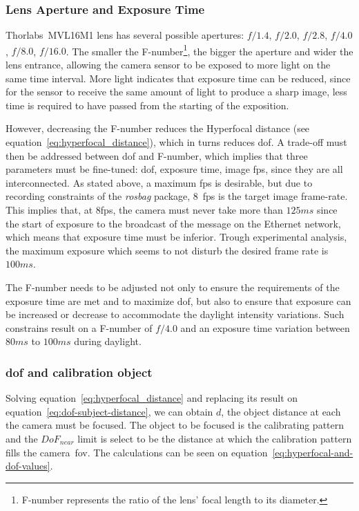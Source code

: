 \subsubsection{Lens Aperture and Exposure Time}
Thorlabs\cp~MVL16M1 lens has several possible apertures: $f/1.4$, $f/2.0$, $f/2.8$, $f/4.0$, $f/8.0$, $f/16.0$. The smaller the F-number\footnote{F-number represents the ratio of the lens' focal length to its diameter.}, the bigger the aperture and wider the lens entrance, allowing the camera sensor to be exposed to more light on the same time interval. More light indicates that exposure time can be reduced, since for the sensor to receive the same amount of light to produce a sharp image, less time is required to have passed from the starting of the exposition.

However, decreasing the F-number reduces the Hyperfocal distance (see equation~\ref{eq:hyperfocal_distance}), which in turns reduces \acf{dof}. A trade-off must then be addressed between \ac{dof} and F-number, which implies that three parameters must be fine-tuned: \ac{dof}, exposure time, image \ac{fps}, since they are all interconnected. As stated above, a maximum \ac{fps} is desirable, but due to recording constraints of the \emph{rosbag} package, $8$~\ac{fps} is the target image frame-rate. This implies that, at $8$\ac{fps}, the camera must never take more than $125ms$ since the start of exposure to the broadcast of the message on the Ethernet network, which means that exposure time must be inferior. Trough experimental analysis, the maximum exposure which seems to not disturb the desired frame rate is $100ms$. 

The F-number needs to be adjusted not only to ensure the requirements of the exposure time are met and to maximize \acl{dof}, but also to ensure that exposure can be increased or decrease to accommodate the daylight intensity variations. Such constrains result on a F-number of $f/4.0$ and an exposure time variation between $80ms$ to $100ms$ during daylight.

\subsubsection{\acl{dof} and calibration object}
Solving equation~\ref{eq:hyperfocal_distance} and replacing its result on equation~\ref{eq:dof-subject-distance}, we can obtain $d$, the object distance at each the camera must be focused. The object to be focused is the calibrating pattern and the $DoF_{near}$ limit is select to be the distance at which the calibration pattern fills the camera~\ac{fov}. The calculations can be seen on equation~\ref{eq:hyperfocal-and-dof-values}.

